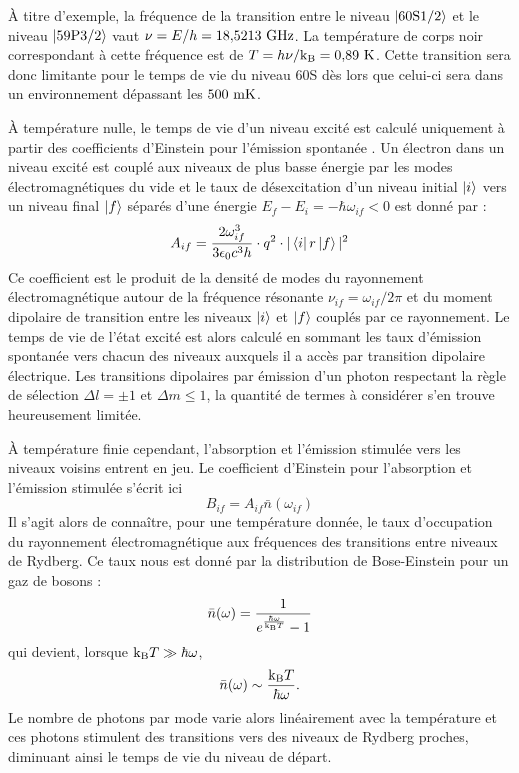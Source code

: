 \`A titre d'exemple, la fréquence de la transition entre le niveau $\ket{60\mathrm{S}1/2}$ et le niveau $\ket{59\mathrm{P}3/2}$ vaut $\nu = E/h = \numv{18.5213}\si{\giga\hertz}$. La température de corps noir correspondant à cette fréquence est de $T=h\nu /\kb = \numv{0.89}\si{\kelvin}$.
Cette transition sera donc limitante pour le temps de vie du niveau 60S dès lors que celui-ci sera dans un environnement dépassant les $\numv{500}\si{\milli\kelvin}$.

\`A température nulle, le temps de vie d'un niveau excité est calculé uniquement à partir des coefficients d'Einstein pour l'émission spontanée \cite{MX_GALLAGHERBBODY}. Un électron dans un niveau excité est couplé aux niveaux de plus basse énergie par les modes électromagnétiques du vide et le taux de désexcitation d'un niveau initial $\ket{i}$ vers un niveau final $\ket{f}$ séparés d'une énergie $E_f - E_i = -\hbar \omega_{if} < 0$ est donné par :
\begin{equation}\label{eq:EinsteinAif}
A_{if} = \frac{2\omega_{if}^3}{3\epsilon_0c^3h}\cdot q^2\cdot |\bra{i}r\ket{f}|^2
\end{equation}
Ce coefficient est le produit de la densité de modes du rayonnement électromagnétique autour de la fréquence résonante $\nu_{if}=\omega_{if}/2\pi$ et du moment dipolaire de transition entre les niveaux $\ket{i}$ et $\ket{f}$ couplés par ce rayonnement.
Le temps de vie de l'état excité est alors calculé en sommant les taux d'émission spontanée vers chacun des niveaux auxquels il a accès par transition dipolaire électrique.
Les transitions dipolaires par émission d'un photon respectant la règle de sélection $\Delta l = \pm1$ et $\Delta m \leq 1$, la quantité de termes à considérer s'en trouve heureusement limitée.

\`A température finie cependant, l'absorption et l'émission stimulée vers les niveaux voisins entrent en jeu.
Le coefficient d'Einstein pour l'absorption et  l'émission stimulée s'écrit ici
\begin{equation}\label{eq:EinsteinBif}
B_{if} = A_{if} \bar{n}(\omega_{if})
\end{equation}
Il s'agit alors de connaître, pour une température donnée, le taux d'occupation du rayonnement électromagnétique aux fréquences des transitions entre niveaux de Rydberg.
Ce taux nous est donné par la distribution de Bose-Einstein pour un gaz de bosons \cite{TXT_GORECKIPHYSTAT} :
\begin{equation}\label{eq:BoseStat}
\bar{n}(\omega) = \frac{1}{e^{\frac{\hbar\omega}{\mathrm{k_B} T}}-1}
\end{equation}
qui devient, lorsque $\mathrm{k_B} T \gg \hbar\omega$,
\begin{equation}\label{eq:BoseStat_blackbody}
\bar{n}(\omega) \sim \frac{\mathrm{k_B} T}{\hbar\omega}.
\end{equation}
Le nombre de photons par mode varie alors linéairement avec la température et ces photons stimulent des transitions vers des niveaux de Rydberg proches, diminuant ainsi le temps de vie du niveau de départ.



